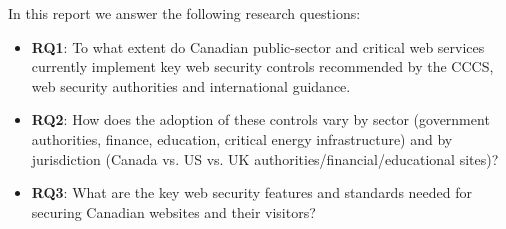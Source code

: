 \documentclass[pdflatex,sn-mathphys-num]{sn-jnl}
\numberwithin{equation}{section}
\theoremstyle{thmstyleone}
\theoremstyle{thmstyletwo}%
\theoremstyle{thmstylethree}%
\begin{document}
 \vspace{1em}In this report we answer the following research questions: 

 \begin{itemize}
     \vspace{0.4em} \item \textbf{RQ1}: To what extent do Canadian public-sector and critical web services 
     currently implement key web security controls recommended by the CCCS, web security authorities and international guidance.
     \vspace{0.4em} \item \textbf{RQ2}: How does the adoption of these controls vary by sector (government authorities, 
     finance, education, critical energy infrastructure) and by jurisdiction (Canada vs. US vs. UK authorities/financial/educational sites)?
     \vspace{0.4em} \item \textbf{RQ3}: What are the key web security features and standards needed for securing Canadian websites 
     and their visitors?
 \end{itemize}



\end{document}
